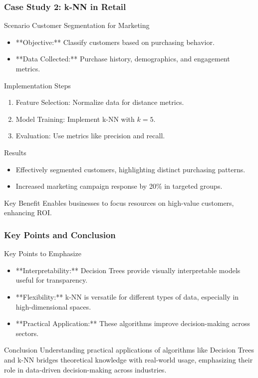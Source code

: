 \documentclass[aspectratio=169]{beamer}
\begin{document}
\begin{frame}[fragile]
  \frametitle{Case Study 2: k-NN in Retail}
  \begin{block}{Scenario}
    Customer Segmentation for Marketing
  \end{block}
  \begin{itemize}
    \item **Objective:** Classify customers based on purchasing behavior.
    \item **Data Collected:** Purchase history, demographics, and engagement metrics.
  \end{itemize}
  
  \begin{block}{Implementation Steps}
    \begin{enumerate}
      \item Feature Selection: Normalize data for distance metrics.
      \item Model Training: Implement k-NN with \( k=5 \).
      \item Evaluation: Use metrics like precision and recall.
    \end{enumerate}
  \end{block}
  
  \begin{block}{Results}
    \begin{itemize}
      \item Effectively segmented customers, highlighting distinct purchasing patterns.
      \item Increased marketing campaign response by 20\% in targeted groups.
    \end{itemize}
  \end{block}
  
  \begin{block}{Key Benefit}
    Enables businesses to focus resources on high-value customers, enhancing ROI.
  \end{block}
\end{frame}

\begin{frame}[fragile]
  \frametitle{Key Points and Conclusion}
  \begin{block}{Key Points to Emphasize}
    \begin{itemize}
      \item **Interpretability:** Decision Trees provide visually interpretable models useful for transparency.
      \item **Flexibility:** k-NN is versatile for different types of data, especially in high-dimensional spaces.
      \item **Practical Application:** These algorithms improve decision-making across sectors.
    \end{itemize}
  \end{block}
  
  \begin{block}{Conclusion}
    Understanding practical applications of algorithms like Decision Trees and k-NN
    bridges theoretical knowledge with real-world usage, emphasizing their role in
    data-driven decision-making across industries.
  \end{block}
\end{frame}
\end{document}
